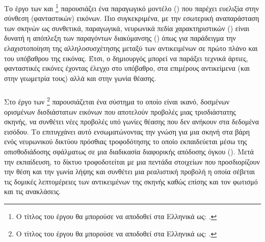 Το έργο των  και \footnote{Ο τίτλος του έργου θα μπορούσε να αποδοθεί στα Ελληνικά ως: .}\cite{niemeyer2021giraffe} παρουσιάζει ένα παραγωγικό μοντέλο () που παρέχει ευελιξία στην σύνθεση (φανταστικών) εικόνων. Πιο συγκεκριμένα, με την εσωτερική αναπαράσταση των σκηνών ως συνθετικά, παραγωγικά, νευρωνικά πεδία χαρακτηριστικών () είναι δυνατή η απόπλεξη των παραγόντων διακύμανσης () όπως για παράδειγμα την ελαχιστοποίηση της αλληλοσυσχέτησης μεταξύ των αντικειμένων σε πρώτο πλάνο και του υπόβαθρου της εικόνας. Έτσι, ο δημιουργός μπορεί να παράξει τεχνικά άρτιες, φανταστικές εικόνες έχοντας έλεγχο στο υπόβαθρο, στα επιμέρους αντικείμενα (και στην γεωμετρία τους) αλλά και στην γωνία θέασης.

\subsubsection{}

Στο έργο των  \footnote{Ο τίτλος του έργου θα μπορούσε να αποδοθεί στα Ελληνικά ως: .}\cite{mildenhall2020nerf} παρουσιάζεται ένα σύστημα το οποίο είναι ικανό, δοσμένων ορισμένων δισδιάστατων εικόνων που αποτελούν προβολές μιας τρισδιάστατης σκηνής, να συνθέτει νέες προβολές υπό γωνίες θέασης που δεν ανήκουν στα δεδομένα εισόδου. Το επιτυγχάνει αυτό ενσωματώνοντας την γνώση για μια σκηνή στα βάρη ενός νευρωνικού δικτύου πρόσθιας τροφοδότησης το οποίο εκπαιδεύεται μέσω της οπισθοδιάδοσης σφάλματως σε μια διαδικασία διαφορικής απόδοσης όγκου (). Μετά την εκπαίδευση, το δίκτυο τροφοδοτείται με μια πεντάδα στοιχείων που προσδιορίζουν την θέση και την γωνία λήψης και συνθέτει μια ρεαλιστική προβολή η οποία σέβεται τις δομικές λεπτομέρειες των αντικειμένων της σκηνής καθώς επίσης και τον φωτισμό και τις ανακλάσεις.
